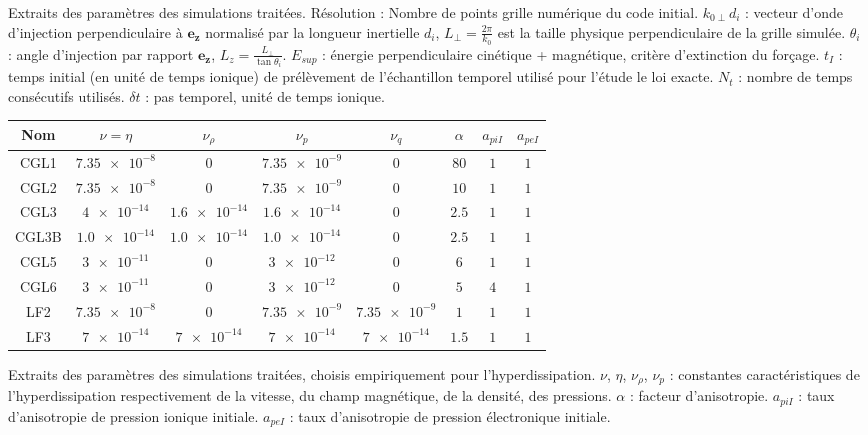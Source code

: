 \begin{table}[!ht]
\begin{center}
\caption{Extraits des paramètres des simulations traitées. Résolution : Nombre de points grille numérique du code initial. $k_{0 \perp}d_i$ : vecteur d'onde d'injection perpendiculaire à $\boldsymbol{e_z}$ normalisé par la longueur inertielle $d_i$, $L_{\perp} =\frac{2\pi}{k_{0}}$ est la taille physique perpendiculaire de la grille simulée. $\theta_i$ : angle d'injection par rapport $\boldsymbol{e_z}$, $L_{z} =\frac{L_{\perp}}{\tan \theta_i }$.  $E_{sup}$  : énergie perpendiculaire cinétique + magnétique, critère d'extinction du forçage. $t_I$ : temps initial (en unité de temps ionique) de prélèvement de l'échantillon temporel utilisé pour l'étude le loi exacte. $N_t$ : nombre de temps consécutifs utilisés. $\delta t$ : pas temporel, unité de temps ionique.  \label{tab:setups}}

\begin{tabular}{ c|c|c|c|c|c|c|c } 
Nom & $\nu=\eta$ & $\nu_{\rho}$  & $\nu_p$ & $\nu_q$ & $\alpha$ & $a_{piI}$ & $a_{peI}$\\
\hline
CGL1 & $\num{7.35e-8}$ & $0$ & $\num{7.35e-9}$ & $0$ & $\num{80}$ & $\num{1}$ &  $\num{1}$ \\
CGL2 & $\num{7.35e-8}$ & $0$ & $\num{7.35e-9}$ & $0$& $\num{10}$ & $\num{1}$ &  $\num{1}$ \\
CGL3 & $\num{4e-14}$ & $\num{1.6e-14}$ & $\num{1.6e-14}$  & $0$& $\num{2.5}$ & $\num{1}$ &  $\num{1}$\\
CGL3B & $\num{1.0e-14}$ & $\num{1.0e-14}$ & $\num{1.0e-14}$ & $0$ & $\num{2.5}$ & $\num{1}$ &  $\num{1}$\\
CGL5 & $\num{3e-11}$ & $0$ & $\num{3e-12}$ & $0$& $\num{6}$ & $\num{1}$ &  $\num{1}$ \\
CGL6 & $\num{3e-11}$ & $0$ & $\num{3e-12}$ & $0$& $\num{5}$ & $\num{4}$ &  $\num{1}$  \\
\hline
LF2 & $\num{7.35e-8}$ & $0$ & $\num{7.35e-9}$& $\num{7.35e-9}$& $\num{1}$  & $\num{1}$ &  $\num{1}$\\
LF3 & $\num{7e-14}$ &$\num{7e-14}$ & $\num{7e-14}$ & $\num{7e-14}$ & $\num{1.5}$ & $\num{1}$ &  $\num{1}$\\
\end{tabular}
\caption{Extraits des paramètres des simulations traitées, choisis empiriquement pour l'hyperdissipation. $\nu$, $\eta$, $\nu_{\rho}$, $\nu_p$ : constantes caractéristiques de l'hyperdissipation respectivement de la vitesse, du champ magnétique, de la densité, des pressions. $\alpha$ : facteur d'anisotropie. $a_{piI}$ : taux d'anisotropie de pression ionique initiale. $a_{peI}$ : taux d'anisotropie de pression électronique initiale.  \label{tab:setups_hd}}
\end{center}
\end{table}
